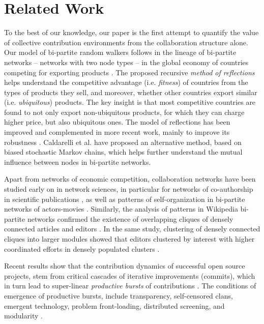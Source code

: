 \section{Related Work}
To the best of our knowledge, our paper is the first attempt to quantify the value of collective contribution environments from the collaboration structure alone. Our model of {bi-partite random walkers} follows in the lineage of bi-partite networks -- networks with two node types -- in the global economy of countries competing for exporting products \cite{hidalgo2007,hidalgo2009}. The proposed recursive {\it method of reflections} helps understand the competitive advantage (i.e. {\it fitness}) of countries from the types of products they sell, and moreover, whether other countries export similar  (i.e. {\it ubiquitous}) products. The key insight is that most competitive countries are found to not only export non-ubiquitous products, for which they can charge higher price, but also ubiquitous ones. The model of reflections has been improved and complemented in more recent work, mainly to improve its robustness \cite{tacchella2012new, cristelli2012competitors, tacchella2013economic, cristelli2013measuring}. Caldarelli et al. \cite{caldarelli2012network} have proposed an alternative method, based on biased stochastic Markov chains, which helps further understand the mutual influence between nodes in bi-partite networks.

Apart from networks of economic competition, collaboration networks have been studied early on in network sciences, in particular for networks of co-authorship in scientific publications \cite{newman2001}, as well as patterns of self-organization in bi-partite networks of actors-movies \cite{ramasco2004self}. Similarly, the analysis of patterns in Wikipedia bi-partite networks confirmed the existence of overlapping cliques of densely connected articles and editors  \cite{jesus2009}. In the same study, clustering of densely connected cliques into larger modules \cite{guimera2007module} showed that editors clustered by interest with higher coordinated efforts in densely populated clusters \cite{jesus2009}.

Recent results show that the contribution dynamics of successful open source projects, stem from critical cascades of iterative improvements (commits), which in turn lead to super-linear {\it productive bursts} of contributions \cite{sornette2014howmuch}.  The conditions of emergence of productive bursts, include transparency, self-censored clans, emergent technology, problem front-loading, distributed screening, and modularity \cite{vonkrogh2014designing}. 

